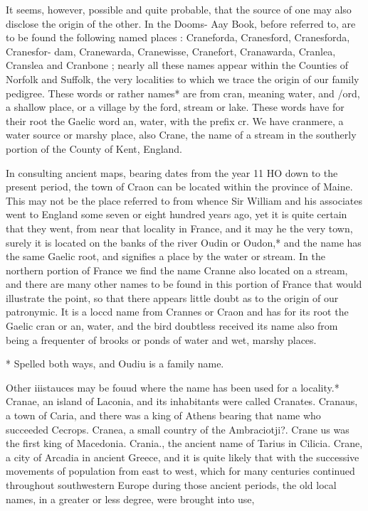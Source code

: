 \documentclass{book}
\begin{document}
It seems, however, possible and quite probable, that the source 
of one may also disclose the origin of the other. In the Dooms- 
Aay Book, before referred to, are to be found the following 
named places : Craneforda, Cranesford, Cranesforda, Cranesfor- 
dam, Cranewarda, Cranewisse, Cranefort, Cranawarda, Cranlea, 
Cranslea and Cranbone ; nearly all these names appear within the 
Counties of Norfolk and Suffolk, the very localities to which we 
trace the origin of our family pedigree. These words or rather 
names* are from cran, meaning water, and /ord, a shallow place, 
or a village by the ford, stream or lake. These words have for 
their root the Gaelic word an, water, with the prefix cr. We 
have cranmere, a water source or marshy place, also Crane, the 
name of a stream in the southerly portion of the County of Kent, 
England. 

In consulting ancient maps, bearing dates from the year 11 HO 
down to the present period, the town of Craon can be located 
within the province of Maine. This may not be the place referred 
to from whence Sir William and his associates went to England 
some seven or eight hundred years ago, yet it is quite certain that 
they went, from near that locality in France, and it may he the 
very town, surely it is located on the banks of the river Oudin or 
Oudon,* and the name has the same Gaelic root, and signifies a 
place by the water or stream. In the northern portion of France 
we find the name Cranne also located on a stream, and there are 
many other names to be found in this portion of France that 
would illustrate the point, so that there appears little doubt as to 
the origin of our patronymic. It is a loccd name from Crannes 
or Craon and has for its root the Gaelic cran or an, water, and 
the bird doubtless received its name also from being a frequenter 
of brooks or ponds of water and wet, marshy places. 

* Spelled both ways, and Oudiu is a family name. 




Other iiistauces may be fouud where the name has been used 
for a locality.* Cranae, an island of Laconia, and its inhabitants 
were called Cranates. Cranaus, a town of Caria, and there was 
a king of Athens bearing that name who succeeded Cecrops. 
Cranea, a small country of the Ambraciotji?. Crane us was the 
first king of Macedonia. Crania., the ancient name of Tarius in 
Cilicia. Crane, a city of Arcadia in ancient Greece, and it is 
quite likely that with the successive movements of population 
from east to west, which for many centuries continued throughout 
southwestern Europe during those ancient periods, the old local 
names, in a greater or less degree, were brought into use, 
\end{document}
